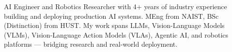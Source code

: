 \begin{cvparagraph}


AI Engineer and Robotics Researcher with 4+ years of industry experience building and deploying production AI systems.
MEng from NAIST, BSc (Distinction) from HUST.
My work spans LLMs, Vision-Language Models (VLMs), Vision-Language Action Models (VLAs), Agentic AI, and robotics platforms --- bridging research and real-world deployment.

\end{cvparagraph}